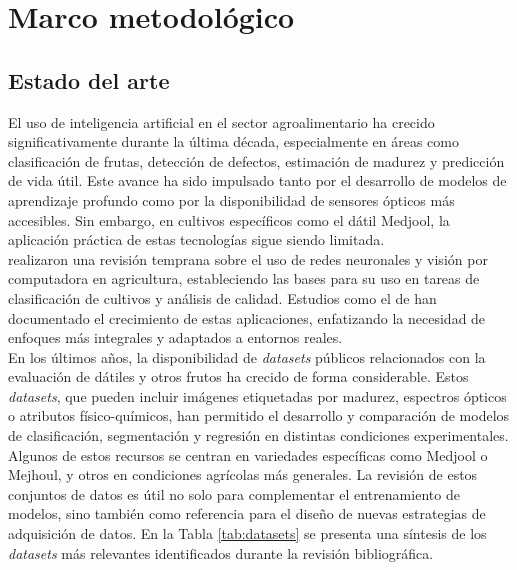 
\chapter{Marco metodológico}

\label{Chapter3}


\section{Estado del arte}

El uso de inteligencia artificial en el sector agroalimentario ha crecido significativamente durante la última década, especialmente en áreas como clasificación de frutas, detección de defectos, estimación de madurez y predicción de vida útil. Este avance ha sido impulsado tanto por el desarrollo de modelos de aprendizaje profundo como por la disponibilidad de sensores ópticos más accesibles. Sin embargo, en cultivos específicos como el dátil Medjool, la aplicación práctica de estas tecnologías sigue siendo limitada.\\

\parencite{kamilaris_deep_2018} realizaron una revisión temprana sobre el uso de redes neuronales y visión por computadora en agricultura, estableciendo las bases para su uso en tareas de clasificación de cultivos y análisis de calidad. Estudios como el de \parencite{garcia_vazquez_scientometric_2021, upadhyay_artificial_2025} han documentado el crecimiento de estas aplicaciones, enfatizando la necesidad de enfoques más integrales y adaptados a entornos reales.\\

En los últimos años, la disponibilidad de \textit{datasets} públicos relacionados con la evaluación de dátiles y otros frutos ha crecido de forma considerable. Estos \textit{datasets}, que pueden incluir imágenes etiquetadas por madurez, espectros ópticos o atributos físico-químicos, han permitido el desarrollo y comparación de modelos de clasificación, segmentación y regresión en distintas condiciones experimentales. Algunos de estos recursos se centran en variedades específicas como Medjool o Mejhoul, y otros en condiciones agrícolas más generales. La revisión de estos conjuntos de datos es útil no solo para complementar el entrenamiento de modelos, sino también como referencia para el diseño de nuevas estrategias de adquisición de datos. En la Tabla \ref{tab:datasets} se presenta una síntesis de los \textit{datasets} más relevantes identificados durante la revisión bibliográfica.\\


